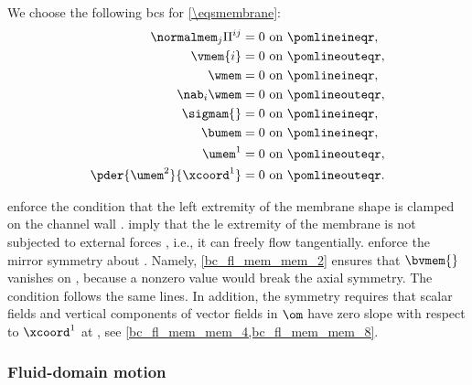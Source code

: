 We choose the following \acp{bc} for \cref{\eqsmembrane}:
\begin{align}
    \label{bc_fl_mem_mem_1}
    \normalmem_j \Pi^{ij}     & = 0 \text{ on } \pomlineineqr,  \\
    \label{bc_fl_mem_mem_2}
    \vmem{i}                  & = 0 \text{ on } \pomlineouteqr, \\
    \label{bc_fl_mem_mem_3}
    \wmem                     & = 0 \text{ on } \pomlineineqr,  \\
    \label{bc_fl_mem_mem_4}
    \nab_i \wmem              & = 0 \text{ on } \pomlineouteqr, \\
    \label{bc_fl_mem_mem_5}
    \sigmam{}                 & = 0 \text{ on } \pomlineineqr,  \\
    \label{bc_fl_mem_mem_6}
    \bumem                    & = 0 \text{ on } \pomlineineqr,  \\
    \label{bc_fl_mem_mem_7}
    \umem^1                   & = 0 \text{ on } \pomlineouteqr, \\
    \label{bc_fl_mem_mem_8}
    \pder{\umem^2}{\xcoord^1} & = 0 \text{ on } \pomlineouteqr.
\end{align}

 enforce the condition that the left extremity of the membrane shape is clamped on the channel wall \pomin.
 imply that the \ac{le} extremity of the membrane is not subjected to  external forces \cite{landauFluidMechanics1987}, i.e., it can freely flow tangentially.
%
 enforce the mirror symmetry about \pomout.
Namely, \cref{bc_fl_mem_mem_2} ensures that  $\bvmem{}$  vanishes on \pomlineout, because a nonzero value  would break the axial symmetry. The condition  follows the same lines. In addition, the  symmetry requires that scalar fields and vertical components of vector fields in $\om$ have zero slope with respect to $\xcoord^1$ at \pomlineout{}, see \cref{bc_fl_mem_mem_4,bc_fl_mem_mem_8}.

\subsubsection{Fluid-domain motion}
\label{sec_fl_mem_dom}



